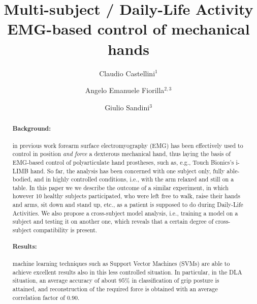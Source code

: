 \documentclass[10pt]{bmc_article}
\newenvironment{bmcformat}{\begin{raggedright}\baselineskip20pt\sloppy\setboolean{publ}{false}}{\end{raggedright}\baselineskip20pt\sloppy}
\begin{document}
\begin{bmcformat}

\title{Multi-subject / Daily-Life Activity\\EMG-based control of mechanical hands}
 
\author{%
  Claudio Castellini\correspondingauthor$^1$%
\and
  Angelo Emanuele Fiorilla$^{2,3}$%
\and
  Giulio Sandini$^3$%
}%

\address{%
    \iid(1)LIRA-Lab, University of Genova, viale F. Causa 13, 16145 Genova, Italy\\
    \iid(2)DIST, University of Genova, viale F. Causa 13, 16145 Genova, Italy\\
    \iid(3)Italian Institute of Technology, via Morego 30, 16163 Genova, Italy
}%

\maketitle

\begin{abstract}

\paragraph*{Background:}
in previous work \cite{2008.ICRA,2008.BioCyb}
forearm surface electromyography (EMG) has been effectively used to
control in position \emph{and force} a dexterous mechanical hand, thus laying the basis of
EMG-based control of polyarticulate hand prostheses, such as, e.g.,
Touch Bionics's i-LIMB hand.
So far, the analysis has been concerned with one subject only, fully
able-bodied, and in highly controlled conditions, i.e., with the arm
relaxed and still on a table. In this paper we we describe the outcome of a similar experiment, in which however $10$ healthy subjects participated,
who were left free to walk, raise their hands and arms, sit
down and stand up, etc., as a patient is supposed to do during
Daily-Life Activities. We also propose a cross-subject model analysis, i.e., training a model on a subject and testing it on another one, which reveals that a certain degree of cross-subject compatibility is present.
      
\paragraph*{Results:}
machine learning techniques such as Support Vector Machines (SVMs) are able to achieve excellent results also in this less controlled situation. In particular, in the DLA situation, an average accuracy of about $95\%$ in classification of grip posture is attained, and reconstruction of the required force is obtained with an average correlation factor of $0.90$.


\end{abstract}
\end{bmcformat}
\end{document}
